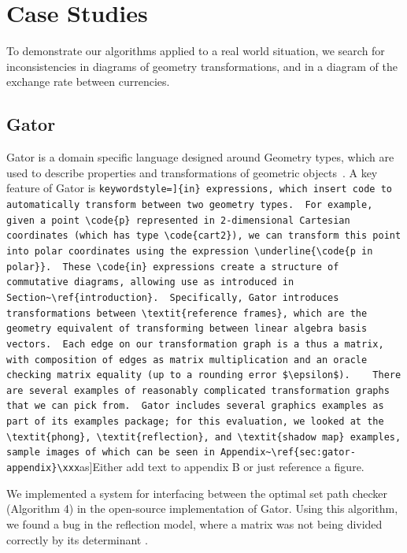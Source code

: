 \documentclass[sigplan,review,anonymous]{acmart}
\newcommand{\code}{\lstinline[keywordstyle=]}
\begin{document}
{\section{Case Studies}


To demonstrate our algorithms applied to a real world situation,
we search for inconsistencies in diagrams of geometry transformations, and in a diagram of the exchange rate between currencies.

\subsection{Gator}
\label{sec:gator}

Gator is a domain specific language designed around Geometry types, which are used to describe properties and transformations of geometric objects~\cite{gator}.  A key feature of Gator is \code{in} expressions, which insert code to automatically transform between two geometry types.  For example, given a point \code{p} represented in 2-dimensional Cartesian coordinates (which has type \code{cart2}), we can transform this point into polar coordinates using the expression \underline{\code{p in polar}}.  These \code{in} expressions create a structure of commutative diagrams, allowing use as introduced in Section~\ref{introduction}.

Specifically, Gator introduces transformations between \textit{reference frames}, which are the geometry equivalent of transforming between linear algebra basis vectors.  Each edge on our transformation graph is a thus a matrix, with composition of edges as matrix multiplication and an oracle checking matrix equality (up to a rounding error $\epsilon$).  

There are several examples of reasonably complicated transformation graphs that we can pick from.  Gator includes several graphics examples as part of its examples package; for this evaluation, we looked at the \textit{phong}, \textit{reflection}, and \textit{shadow map} examples, sample images of which can be seen in Appendix~\ref{sec:gator-appendix}\xxx[as]{Either add text to appendix B or just reference a figure}.

We implemented a system for interfacing between the optimal set path checker (Algorithm 4) in the open-source implementation of Gator.
Using this algorithm, we found a bug in the reflection model, where a matrix was not being divided correctly by its determinant .

}
\end{document}

